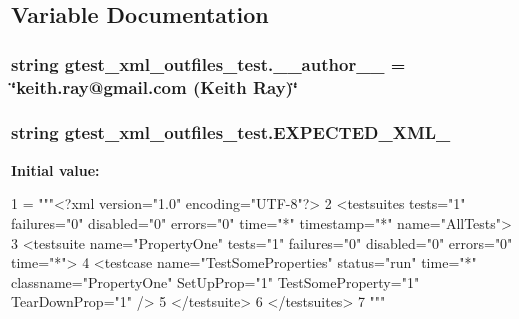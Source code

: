 \subsection{Variable Documentation}
\hypertarget{namespacegtest__xml__outfiles__test_afbbd173129c3129e94bf58faebc4d525}{
\subsubsection[{\-\_\-\-\_\-author\-\_\-\-\_\-}]{\setlength{\rightskip}{0pt plus 5cm}string gtest\-\_\-xml\-\_\-outfiles\-\_\-test.\-\_\-\-\_\-author\-\_\-\-\_\- = \char`\"{}keith.\-ray@gmail.\-com (Keith Ray)\char`\"{}}}\label{namespacegtest__xml__outfiles__test_afbbd173129c3129e94bf58faebc4d525}
\hypertarget{namespacegtest__xml__outfiles__test_a9d7b71e2d97dc7705cbe6e4882824c14}{
\subsubsection[{E\-X\-P\-E\-C\-T\-E\-D\-\_\-\-X\-M\-L\-\_\-1}]{\setlength{\rightskip}{0pt plus 5cm}string gtest\-\_\-xml\-\_\-outfiles\-\_\-test.\-E\-X\-P\-E\-C\-T\-E\-D\-\_\-\-X\-M\-L\-\_}}\label{namespacegtest__xml__outfiles__test_a9d7b71e2d97dc7705cbe6e4882824c14}
{\bfseries Initial value\-:}
\begin{DoxyCode}
1 = \textcolor{stringliteral}{"""<?xml version="1.0" encoding="UTF-8"?>}
2 \textcolor{stringliteral}{<testsuites tests="1" failures="0" disabled="0" errors="0" time="*" timestamp="*" name="AllTests">}
3 \textcolor{stringliteral}{  <testsuite name="PropertyOne" tests="1" failures="0" disabled="0" errors="0" time="*">}
4 \textcolor{stringliteral}{    <testcase name="TestSomeProperties" status="run" time="*" classname="PropertyOne" SetUpProp="1"
       TestSomeProperty="1" TearDownProp="1" />}
5 \textcolor{stringliteral}{  </testsuite>}
6 \textcolor{stringliteral}{</testsuites>}
7 \textcolor{stringliteral}{"""}
\end{DoxyCode}
